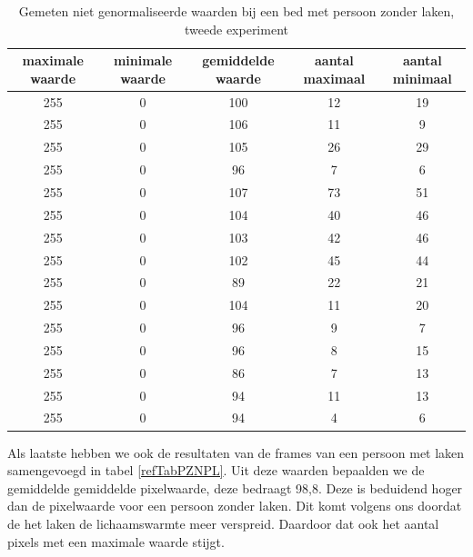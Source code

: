 \begin{table}[h]
	\begin{tabular}{|c|c|c|c|c|}
		\hline
		maximale waarde & minimale waarde & gemiddelde waarde & aantal maximaal & aantal minimaal \\ \hline
		255 & 0 & 100 & 12 & 19 \\ \hline
		255 & 0 & 106 & 11 & 9  \\ \hline
		255 & 0 & 105 & 26 & 29 \\ \hline
		255 & 0 & 96  & 7  & 6 \\ \hline
		255 & 0 & 107 & 73 & 51  \\ \hline
		255 & 0 & 104 & 40 & 46 \\ \hline
		255 & 0 & 103 & 42 & 46 \\ \hline
		255 & 0 & 102 & 45 & 44 \\ \hline
		255 & 0 & 89  & 22 & 21 \\ \hline
		255 & 0 & 104 & 11 & 20 \\ \hline
		255 & 0 & 96  & 9  & 7 \\ \hline
		255 & 0 & 96  & 8  & 15 \\ \hline
		255 & 0 & 86  & 7  & 13  \\ \hline
		255 & 0 & 94  & 11 & 13 \\ \hline
		255 & 0 & 94  & 4  & 6  \\ \hline
	\end{tabular}
	\caption{Gemeten niet genormaliseerde waarden bij een bed met persoon zonder laken, tweede experiment}
	\label{refTabPZNPT}
\end{table}
Als laatste hebben we ook de resultaten van de frames van een persoon met laken samengevoegd in tabel \ref{refTabPZNPL}. Uit deze waarden bepaalden we de gemiddelde gemiddelde pixelwaarde, deze bedraagt 98,8. Deze is beduidend hoger dan de pixelwaarde voor een persoon zonder laken. Dit komt volgens ons doordat de het laken de lichaamswarmte meer verspreid. Daardoor dat ook het aantal pixels met een maximale waarde stijgt. \\
